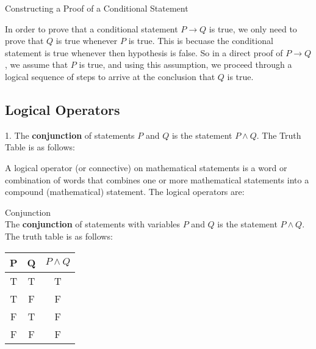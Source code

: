 \begin{definition}
Constructing a Proof of a Conditional Statement

In order to prove that a conditional statement $P \to Q$ is true, we only need to prove that $Q$ is true whenever $P$ is true. This is becuase the conditional statement is true whenever then hypothesis is false. So in a direct proof of $P \to Q$, we assume that $P$ is true, and using this assumption, we proceed through a logical sequence of steps to arrive at the conclusion that $Q$ is true. \\
\end{definition}









\newpage
\subsection{Logical Operators}

1. The {\bf conjunction} of statements $P$ and $Q$ is the statement $P \wedge Q$. The Truth Table is as follows: 

A logical operator (or connective) on mathematical statements is a word or combination of words that combines one or more mathematical statements into a compound (mathematical) statement. The logical operators are: \\

\begin{definition}
Conjunction \\

The {\bf conjunction} of statements with variables $P$ and $Q$ is the statement $P \wedge Q$. The truth table is as follows: \\
\begin{center}
\begin{tabular}{|c|c|c|}
\hline 
P & Q & $P \wedge Q$ \\ 
\hline 
T & T & T \\ 
\hline 
T & F & F \\ 
\hline 
F & T & F \\ 
\hline 
F & F & F \\ 
\hline 
\end{tabular} 
\end{center}
\end{definition}


